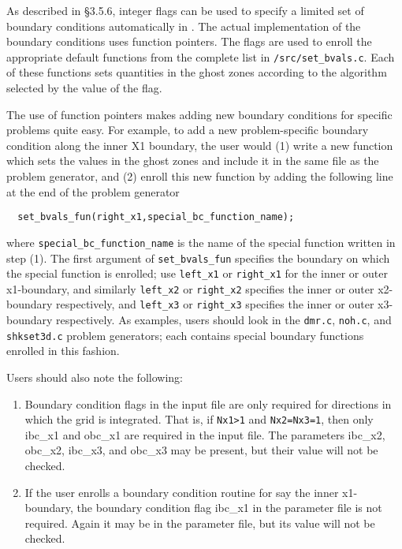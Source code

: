 As described in \S 3.5.6, integer flags can be used to specify a limited set
of boundary conditions automatically in \ath.  The actual implementation of
the boundary conditions uses function pointers.  The
flags are used to enroll the appropriate default 
functions from the complete list in {\tt /src/set\_bvals.c}.  Each of these
functions sets quantities in the ghost zones according to the 
algorithm selected by the value of the flag.

The use of function pointers makes adding new boundary conditions for
specific problems quite easy.  For example, to add a new problem-specific
boundary condition along the inner X1 boundary, the user would (1)
write a new function which sets the values in the ghost zones and include
it in the
same file as the problem generator, and (2) enroll this new function by
adding the following line at the end of the problem generator
\begin{verbatim}
  set_bvals_fun(right_x1,special_bc_function_name);
\end{verbatim}

\noindent
where {\tt special\_bc\_function\_name} is the name of the special
function written in step (1).  The first argument of {\tt set\_bvals\_fun}
specifies the boundary on which the special function is enrolled; use
{\tt left\_x1} or {\tt right\_x1} for the inner or outer x1-boundary,
and similarly {\tt left\_x2} or {\tt right\_x2} specifies the inner or
outer x2-boundary respectively, and {\tt left\_x3} or {\tt right\_x3}
specifies the inner or outer x3-boundary respectively.  As examples,
users should look in the {\tt dmr.c}, {\tt noh.c}, and {\tt shkset3d.c}
problem generators; each contains special boundary functions enrolled
in this fashion.

Users should also note the following:

\begin{enumerate}

\item Boundary condition flags in the input file are only required for 
directions in which the grid is integrated.  That is, if {\tt Nx1>1}
and {\tt Nx2=Nx3=1}, then only ibc\_x1 and obc\_x1 are required in the
input file.  The parameters ibc\_x2, obc\_x2, ibc\_x3, and obc\_x3
may be present, but their value will not be checked.

\item If the user enrolls a boundary condition routine for say the inner
x1-boundary, the boundary condition flag ibc\_x1 in the parameter file
is not required.  Again it may be in the parameter file, but its value
will not be checked.

\end{enumerate}

